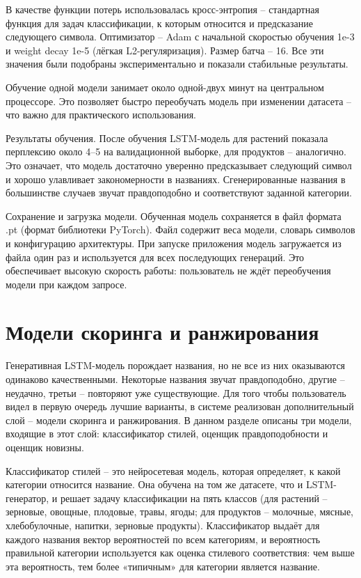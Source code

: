 В качестве функции потерь использовалась кросс-энтропия -- стандартная функция для задач классификации, к которым относится и предсказание следующего символа. Оптимизатор -- Adam с начальной скоростью обучения 1e-3 и weight decay 1e-5 (лёгкая L2-регуляризация). Размер батча -- 16. Все эти значения были подобраны экспериментально и показали стабильные результаты.

Обучение одной модели занимает около одной-двух минут на центральном процессоре. Это позволяет быстро переобучать модель при изменении датасета -- что важно для практического использования.

Результаты обучения. После обучения LSTM-модель для растений показала перплексию около 4--5 на валидационной выборке, для продуктов -- аналогично. Это означает, что модель достаточно уверенно предсказывает следующий символ и хорошо улавливает закономерности в названиях. Сгенерированные названия в большинстве случаев звучат правдоподобно и соответствуют заданной категории.

Сохранение и загрузка модели. Обученная модель сохраняется в файл формата .pt (формат библиотеки PyTorch). Файл содержит веса модели, словарь символов и конфигурацию архитектуры. При запуске приложения модель загружается из файла один раз и используется для всех последующих генераций. Это обеспечивает высокую скорость работы: пользователь не ждёт переобучения модели при каждом запросе.

\section{Модели скоринга и ранжирования}\label{ux43cux43eux434ux435ux43bux438-ux441ux43aux43eux440ux438ux43dux433ux430-ux438-ux440ux430ux43dux436ux438ux440ux43eux432ux430ux43dux438ux44f}

Генеративная LSTM-модель порождает названия, но не все из них оказываются одинаково качественными. Некоторые названия звучат правдоподобно, другие -- неудачно, третьи -- повторяют уже существующие. Для того чтобы пользователь видел в первую очередь лучшие варианты, в системе реализован дополнительный слой -- модели скоринга и ранжирования. В данном разделе описаны три модели, входящие в этот слой: классификатор стилей, оценщик правдоподобности и оценщик новизны.

Классификатор стилей -- это нейросетевая модель, которая определяет, к какой категории относится название. Она обучена на том же датасете, что и LSTM-генератор, и решает задачу классификации на пять классов (для растений -- зерновые, овощные, плодовые, травы, ягоды; для продуктов -- молочные, мясные, хлебобулочные, напитки, зерновые продукты). Классификатор выдаёт для каждого названия вектор вероятностей по всем категориям, и вероятность правильной категории используется как оценка стилевого соответствия: чем выше эта вероятность, тем более «типичным» для категории является название.

